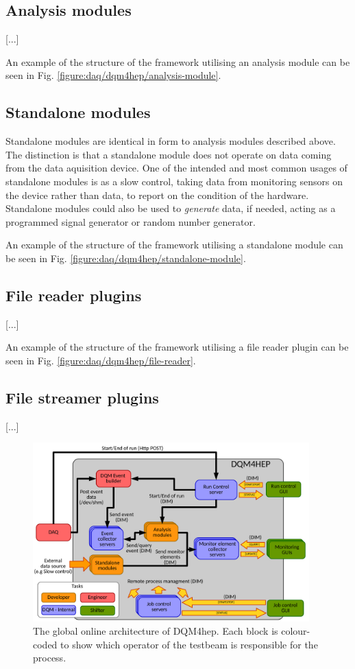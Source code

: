 \subsection{Analysis modules}
[...]

An example of the structure of the framework utilising an analysis module can be seen in Fig. \ref{figure:daq/dqm4hep/analysis-module}.

\subsection{Standalone modules}
Standalone modules are identical in form to analysis modules described above. The distinction is that a standalone module does not operate on data coming from the data aquisition device. One of the intended and most common usages of standalone modules is as a slow control, taking data from monitoring sensors on the device rather than data, to report on the condition of the hardware. Standalone modules could also be used to \emph{generate} data, if needed, acting as a programmed signal generator or random number generator. 

An example of the structure of the framework utilising a standalone module can be seen in Fig. \ref{figure:daq/dqm4hep/standalone-module}.

\subsection{File reader plugins}
[...]

An example of the structure of the framework utilising a file reader plugin can be seen in Fig. \ref{figure:daq/dqm4hep/file-reader}.

\subsection{File streamer plugins}
[...]

\begin{figure}[h]
	\centering
	\includegraphics[width=0.95\textwidth]{../Pictures/GlobalArchitectureDiagram.pdf}
	\caption{The global online architecture of DQM4hep. Each block is colour-coded to show which operator of the testbeam is responsible for the process.}
	\label{figure:daq/dqm4hep/architecture}
\end{figure}

